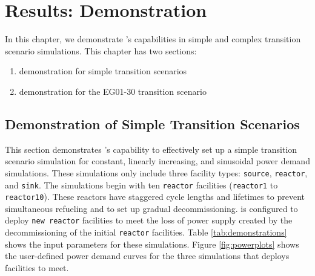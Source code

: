 \chapter{Results: \deploy Demonstration}
In this chapter, we demonstrate \deploy's capabilities
in simple and complex \Cyclus transition scenario simulations.  
This chapter has two sections: 
\begin{enumerate}
    \item \deploy demonstration for simple transition scenarios
    \item \deploy demonstration for the EG01-30 transition scenario
\end{enumerate}

\section{\deploy Demonstration of Simple Transition Scenarios}
\label{sec:demo}

This section demonstrates \deploy's capability 
to effectively set up a simple transition scenario simulation 
for constant, linearly increasing, and 
sinusoidal power demand simulations.
These simulations only include
three facility types: \texttt{source}, \texttt{reactor}, and 
\texttt{sink}. 
The simulations begin with ten \texttt{reactor} facilities 
(\texttt{reactor1} to \texttt{reactor10}). 
These reactors have staggered cycle lengths and lifetimes to prevent 
simultaneous refueling and to set up gradual decommissioning. 
\deploy is configured to deploy \texttt{new reactor} facilities
to meet the loss of power supply created by the decommissioning 
of the initial \texttt{reactor} facilities. 
Table \ref{tab:demonstrations} shows the 
\deploy input parameters for these simulations.
Figure \ref{fig:powerplots} shows the user-defined power demand curves 
for the three simulations that \deploy deploys facilities to meet.

